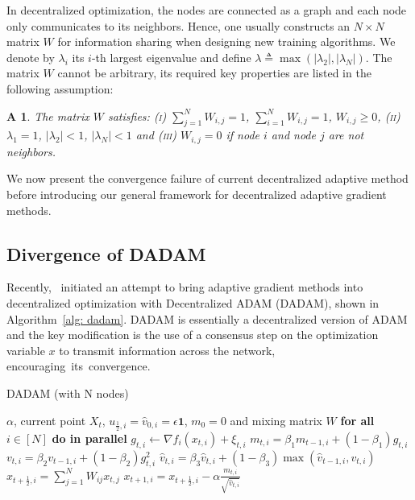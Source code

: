 \documentclass[11pt]{article}
\newtheorem{assumptionA}{A\!\!}
\begin{document}
In decentralized optimization, the nodes are connected as a graph and each node only communicates to its neighbors. 
Hence, one usually constructs an $N \times N$ matrix $W$ for information sharing when designing new training algorithms. 
We denote by $\lambda_i$ its $i$-th largest eigenvalue and define $\lambda \triangleq \max (|\lambda_2|,|\lambda_N|)$.
The matrix $W$ cannot be arbitrary, its required key properties are listed in the following assumption:
\begin{assumptionA}\label{a:matrixW}
The matrix $W$ satisfies: \textsc{(i)} $\sum_{j=1}^N W_{i,j} = 1$,  $\sum_{i=1}^N W_{i,j} = 1$, $W_{i,j} \geq 0$, \textsc{(ii)} $\lambda_1 = 1$, $|\lambda_2| < 1$, $|\lambda_N| < 1 $ and \textsc{(iii)} $W_{i,j} = 0 $ if node $i$ and node $j$ are not neighbors.
\end{assumptionA}
 We now present the convergence failure of current decentralized adaptive method before introducing our general framework for decentralized adaptive gradient methods.


\subsection{Divergence of DADAM}\label{sec:divergence}


Recently,~\citet{nazari2019dadam} initiated an attempt to bring adaptive gradient methods into decentralized optimization with Decentralized ADAM (DADAM), shown in Algorithm~\ref{alg: dadam}.
DADAM is essentially a decentralized version of ADAM and the key modification is the use of a consensus step on the optimization variable $x$ to transmit information across the network, encouraging~its~convergence. 


\begin{algorithm}[H]
	\caption{DADAM (with N nodes)}
	\label{alg: dadam}
	\begin{algorithmic}[1]
		 $\alpha$, current point $X_t$, $u_{\frac{1}{2},i} = \hat v_{0,i} = \epsilon \mathbf{1}$, $m_0=0$ and mixing matrix $W$
		\STATE \textbf{for all }$i \in [N]$ \textbf{do in parallel}
		\STATE \quad $g_{t,i}  \leftarrow \nabla f_i(x_{t,i}) + \xi_{t,i}$
		\STATE \quad $m_{t,i} = \beta_1 m_{t-1,i} + (1-\beta_1) g_{t,i}$ 
		\STATE \quad $v_{t,i} = \beta_2 v_{t-1,i}+(1-\beta_2)g_{t,i}^2$
		\STATE \quad $\hat v_{t,i} = \beta_3 \hat v_{t,i} + (1-\beta_3) \max(\hat v_{t-1,i},v_{t,i})$
		\STATE \quad $x_{t+\frac{1}{2},i} = \sum_{j=1}^N W_{ij}x_{t,j}$
		\STATE \quad $x_{t+1,i} = x_{t+\frac{1}{2},i} - \alpha \frac{m_{t,i}}{\sqrt{\hat v_{t,i}}}$
		\ENDFOR
	\end{algorithmic}
\end{algorithm}
\end{document}
